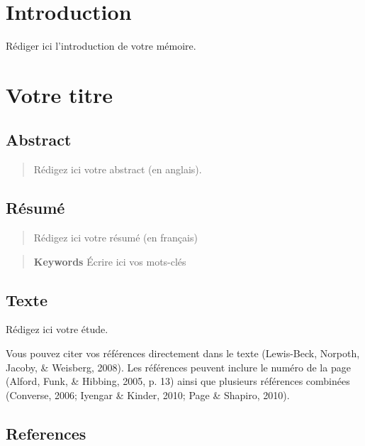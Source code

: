 \documentclass[12pt]{ulaval}
\begin{document}
\onehalfspacing

\hypertarget{introduction}{%
\chapter*{Introduction}\label{introduction}}

Rédiger ici l'introduction de votre mémoire.

\hypertarget{votre-titre}{%
\chapter{Votre titre}\label{votre-titre}}

\hypertarget{abstract}{%
\section{Abstract}\label{abstract}}

\begin{quote}
Rédigez ici votre abstract (en anglais).
\end{quote}

\hypertarget{ruxe9sumuxe9}{%
\section{Résumé}\label{ruxe9sumuxe9}}

\begin{quote}
Rédigez ici votre résumé (en français)
\end{quote}

\begin{quote}
\textbf{Keywords}
Écrire ici vos mots-clés
\end{quote}

\hypertarget{texte}{%
\section{Texte}\label{texte}}

Rédigez ici votre étude.

Vous pouvez citer vos références directement dans le texte (Lewis-Beck, Norpoth, Jacoby, \& Weisberg, 2008). Les références peuvent inclure le numéro de la page (Alford, Funk, \& Hibbing, 2005, p. 13) ainsi que plusieurs références combinées (Converse, 2006; Iyengar \& Kinder, 2010; Page \& Shapiro, 2010).

\hypertarget{references}{%
\section{References}\label{references}}
\end{document}
